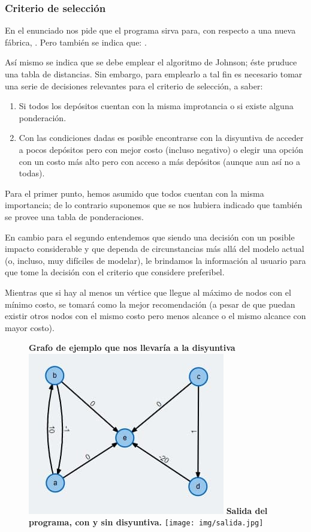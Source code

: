 \documentclass[../tp2_grupo404.tex]{subfiles}
\begin{document}
\subsubsection{Criterio de selección}

En el enunciado nos pide que el programa sirva para, con respecto a una nueva fábrica,
.
Pero también se indica que: .

Así mismo se indica que se debe emplear el algoritmo de Johnson; éste
pruduce una tabla de distancias. Sin embargo, para emplearlo a tal fin es
necesario tomar una serie de decisiones relevantes para el criterio de selección,
a saber:
\begin{enumerate}
    \item Si todos los depósitos cuentan con la misma improtancia o si existe
    alguna ponderación.
    \item Con las condiciones dadas es posible encontrarse con la disyuntiva de
    acceder a pocos depósitos pero con mejor costo (incluso negativo) o elegir
    una opción con un costo más alto pero con acceso a más depósitos (aunque aun
    así no a todas).
\end{enumerate}

Para el primer punto, hemos asumido que todos cuentan con la misma importancia;
de lo contrario suponemos que se nos hubiera indicado que también se provee
una tabla de ponderaciones.

En cambio para el segundo entendemos que siendo una decisión con un posible
impacto considerable y que dependa de circunstancias más allá del modelo actual
(o, incluso, muy difíciles de modelar), le brindamos la información al usuario
para que tome la decisión con el criterio que considere preferibel.

Mientras que si hay al menos un vértice que llegue al máximo de nodos con el
mínimo costo, se tomará como la mejor recomendación (a pesar de que puedan
existir otros nodos con el mismo costo pero menos alcance o el mismo alcance
con mayor costo).

\begin{figure}[H]
    \centering
    \subcaptionbox
        {\label{grafoDisyuntiva}\textbf{Grafo de ejemplo que nos llevaría a la disyuntiva}}
        {\includegraphics[width=0.4\linewidth,angle=0,origin=c]{img/disyuntiva.jpg}}
    \subcaptionbox
        {\label{outDisyuntiva}\textbf{Salida del programa, con y sin disyuntiva.}}
        {\texttt{[image: img/salida.jpg]}}
\end{figure}
\end{document}
